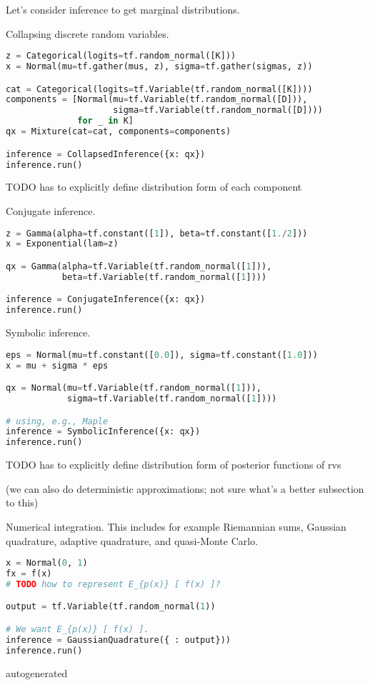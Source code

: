 Let's consider inference to get marginal distributions.

Collapsing discrete random variables.
\begin{lstlisting}[language=Python]
z = Categorical(logits=tf.random_normal([K]))
x = Normal(mu=tf.gather(mus, z), sigma=tf.gather(sigmas, z))

cat = Categorical(logits=tf.Variable(tf.random_normal([K])))
components = [Normal(mu=tf.Variable(tf.random_normal([D])),
                     sigma=tf.Variable(tf.random_normal([D])))
              for _ in K]
qx = Mixture(cat=cat, components=components)

inference = CollapsedInference({x: qx})
inference.run()
\end{lstlisting}
TODO has to explicitly define distribution form of each component

Conjugate inference.
\begin{lstlisting}[language=Python]
z = Gamma(alpha=tf.constant([1]), beta=tf.constant([1./2]))
x = Exponential(lam=z)

qx = Gamma(alpha=tf.Variable(tf.random_normal([1])),
           beta=tf.Variable(tf.random_normal([1])))

inference = ConjugateInference({x: qx})
inference.run()
\end{lstlisting}

Symbolic inference.
\begin{lstlisting}[language=Python]
eps = Normal(mu=tf.constant([0.0]), sigma=tf.constant([1.0]))
x = mu + sigma * eps

qx = Normal(mu=tf.Variable(tf.random_normal([1])),
            sigma=tf.Variable(tf.random_normal([1])))

# using, e.g., Maple
inference = SymbolicInference({x: qx})
inference.run()
\end{lstlisting}
TODO has to explicitly define distribution form of posterior
functions of rvs

(we can also do deterministic approximations; not sure what's a better subsection to this)

Numerical integration. This includes for example Riemannian sums, Gaussian quadrature,
adaptive quadrature, and quasi-Monte Carlo.
\begin{lstlisting}[language=Python]
x = Normal(0, 1)
fx = f(x)
# TODO how to represent E_{p(x)} [ f(x) ]?

output = tf.Variable(tf.random_normal(1))

# We want E_{p(x)} [ f(x) ].
inference = GaussianQuadrature({ : output}))
inference.run()
\end{lstlisting}

{{autogenerated}}

